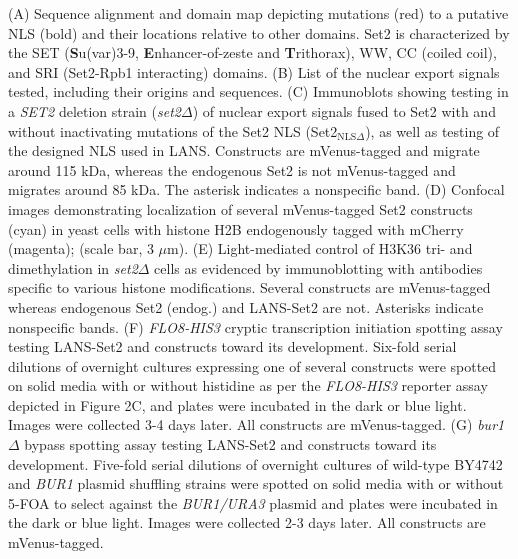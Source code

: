 \documentclass[11pt]{biorxiv}
\newcommand{\burdelt}{\emph{bur1$\Delta$}\xspace}
\newcommand{\setdelt}{\emph{set2$\Delta$}\xspace}
\begin{document}
\noindent (A) Sequence alignment and domain map depicting mutations (red) to a putative NLS (bold) and their locations relative to other domains. Set2 is characterized by the SET (\textbf{S}u(var)3-9, \textbf{E}nhancer-of-zeste and \textbf{T}rithorax), WW, CC (coiled coil), and SRI (Set2-Rpb1 interacting) domains. (B) List of the nuclear export signals tested, including their origins and sequences. (C) Immunoblots showing testing in a \emph{SET2} deletion strain (\setdelt) of nuclear export signals fused to Set2 with and without inactivating mutations of the Set2 NLS (Set2$_{\text{NLS}\Delta}$), as well as testing of the designed NLS used in LANS. Constructs are mVenus-tagged and migrate around 115 kDa, whereas the endogenous Set2 is not mVenus-tagged and migrates around 85 kDa. The asterisk indicates a nonspecific band. (D) Confocal images demonstrating localization of several mVenus-tagged Set2 constructs (cyan) in yeast cells with histone H2B endogenously tagged with mCherry (magenta); (scale bar, 3 $\mu$m). (E) Light-mediated control of H3K36 tri- and dimethylation in \setdelt cells as evidenced by immunoblotting with antibodies specific to various histone modifications. Several constructs are mVenus-tagged whereas endogenous Set2 (endog.) and LANS-Set2 are not. Asterisks indicate nonspecific bands. (F) \emph{FLO8-HIS3} cryptic transcription initiation spotting assay testing LANS-Set2 and constructs toward its development. Six-fold serial dilutions of overnight cultures expressing one of several constructs were spotted on solid media with or without histidine as per the \emph{FLO8-HIS3} reporter assay depicted in Figure 2C, and plates were incubated in the dark or blue light. Images were collected 3-4 days later. All constructs are mVenus-tagged. (G) \burdelt bypass spotting assay testing LANS-Set2 and constructs toward its development. Five-fold serial dilutions of overnight cultures of wild-type BY4742 and \emph{BUR1} plasmid shuffling strains were spotted on solid media with or without 5-FOA to select against the \emph{BUR1/URA3} plasmid and plates were incubated in the dark or blue light. Images were collected 2-3 days later. All constructs are mVenus-tagged.

\clearpage
\end{document}
